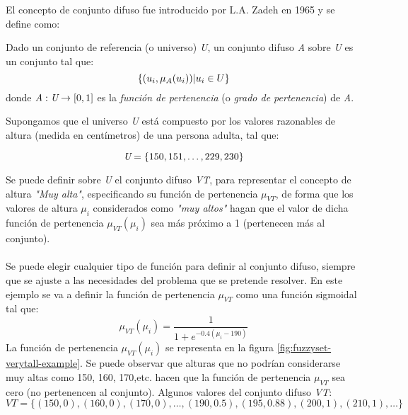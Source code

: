 El concepto de conjunto difuso fue introducido por L.A. Zadeh en 1965 \cite{Zadeh65} y se define como:
\begin{definition}
Dado un conjunto de referencia (o universo) \emph{U}, un conjunto difuso \emph{A} sobre \emph{U} es un conjunto tal que:\\
\begin{equation}
\{(u_{i},\mu_{A}(u_{i}))\arrowvert u_{i} \in U\}
\end{equation}
donde \begin{math}\emph{A}:\emph{U}\rightarrow[0,1]\end{math} es la \emph{función de pertenencia} (o \emph{grado de pertenencia}) de \emph{A}.
\end{definition}

\begin{example}
\normalfont
Supongamos que el universo \emph{U} está compuesto por los valores razonables de altura (medida en centímetros) de una persona adulta, tal que:

\begin{equation}
\emph{U} = \{150,151,\ldots,229,230\}
\end{equation}

Se puede definir sobre \emph{U} el conjunto difuso \emph{VT}, para representar el concepto de altura \emph{"Muy alta"}, especificando su función de pertenencia \emph{$\mu_{VT}$}, de forma que los valores de altura \emph{$\mu_{i}$} considerados como \emph{"muy altos"} hagan que el valor de dicha función de pertenencia \emph{$\mu_{VT}(\mu_{i})$} sea más próximo a 1 (pertenecen más al conjunto).\\
\\
Se puede elegir cualquier tipo de función para definir al conjunto difuso, siempre que se ajuste a las necesidades del problema que se pretende resolver. En este ejemplo se va a definir la función de pertenencia \emph{$\mu_{VT}$} como una función sigmoidal tal que:
\begin{equation}
\mu_{VT}(\mu_{i}) = \frac{1}{1 + e^{-0.4(\mu_{i}-190)}}
\end{equation}
La función de pertenencia $\mu_{VT}(\mu_{i})$ se representa en la figura \ref{fig:fuzzyset-verytall-example}. Se puede observar que alturas que no podrían considerarse muy altas como 150, 160, 170,etc. hacen que la función de pertenencia  $\mu_{VT}$ sea cero (no pertenencen al conjunto). Algunos valores del conjunto difuso \emph{VT}:
\begin{equation}
VT = \{(150,0),(160,0),(170,0),\ldots,(190,0.5),(195,0.88),(200,1),(210,1),\ldots\}
\end{equation}
\end{example}

